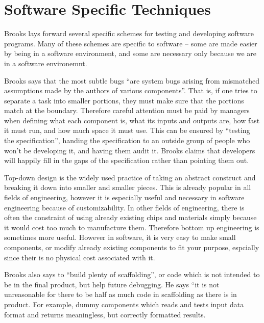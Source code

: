 \section{Software Specific Techniques}
Brooks lays forward several specific schemes for testing and developing software programs.  Many of these schemes are specific to software -- some are made easier by being in a software environment, and some are necessary only because we are in a software environemnt.

Brooks says that the most subtle bugs ``are system bugs arising from mismatched assumptions made by the authors of various components''.  That is, if one tries to separate a task into smaller portions, they must make sure that the portions match at the boundary.  Therefore careful attention must be paid by managers when defining what each component is, what its inputs and outputs are, how fast it must run, and how much space it must use.  This can be ensured by ``testing the specification'', handing the specification to an outside group of people who won't be developing it, and having them audit it.  Brooks claims that developers will happily fill in the gaps of the specification rather than pointing them out.

Top-down design is the widely used practice of taking an abstract construct and breaking it down into smaller and smaller pieces.  This is already popular in all fields of engineering, however it is especially useful and necessary in software engineering because of customizability.  In other fields of engineering, there is often the constraint of using already existing chips and materials simply because it would cost too much to manufacture them.  Therefore bottom up engineering is sometimes more useful.  However in software, it is very easy to make small components, or modify already existing components to fit your purpose, espcially since their is no physical cost associated with it.

Brooks also says to ``build plenty of scaffolding'', or code which is not intended to be in the final product, but help future debugging.  He says ``it is not unreasonable for there to be half as much code in scaffolding as there is in product.  For example, dummy components which reads and tests input data format and returns meaningless, but correctly formatted results.  



